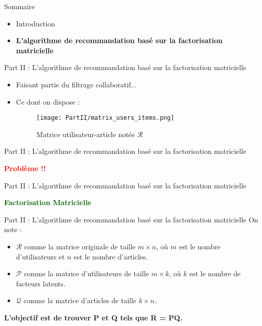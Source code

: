 \newcommand{\PartII}{Part II : L'algorithme de recommandation basé sur la factorisation matricielle}

\begin{frame}{Sommaire}
	\begin{itemize}
		\item Introduction
		\item \textbf{L'algorithme de recommandation basé sur la factorisation matricielle}
	\end{itemize}
\end{frame}

\begin{frame}{\PartII}
	\begin{itemize}
		\item Faisant partie du filtrage collaboratif...
		\item {
		      Ce dont on dispose :
		      \begin{figure}[htbp]
			      \centering
			      \hspace{80pt}
			      \texttt{[image: PartII/matrix\_users\_items.png]}
			      \caption{Matrice utilisateur-article notée $\mathcal{R}$}
			      \label{fig:matrix-user-article}
		      \end{figure}
		      }
	\end{itemize}
\end{frame}

\begin{frame}{\PartII}
	\begin{center}
		\textcolor{red}{\textbf{\large{Problème !!}}}
	\end{center}
\end{frame}

\begin{frame}{\PartII}
	\begin{center}
		\textcolor{darkgreen}{\textbf{\large{Factorisation Matricielle}}}
	\end{center}
\end{frame}

\begin{frame}{\PartII}
	On note :
	\begin{itemize}
		\item $\mathcal{R}$ comme la matrice originale de taille $m \times n$, où $m$ est le nombre d'utilisateurs et $n$ est le nombre d'articles.
		\item $\mathcal{P}$ comme la matrice d'utilisateurs de taille $m \times k$, où $k$ est le nombre de facteurs latents.
		\item $\mathcal{Q}$ comme la matrice d'articles de taille $k \times n$.
	\end{itemize}
	\begin{center}
		\textbf{L'objectif est de trouver P et Q tels que R = PQ.}
	\end{center}
\end{frame}

